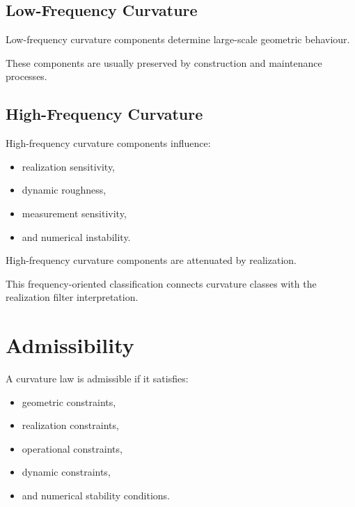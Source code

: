 \subsection{Low-Frequency Curvature}

\begin{definition}
\label{def:low-frequency-curvature}
Low-frequency curvature components determine large-scale geometric
behaviour.
\end{definition}

These components are usually preserved by construction and maintenance
processes.


\subsection{High-Frequency Curvature}

\begin{definition}
\label{def:high-frequency-curvature}
High-frequency curvature components influence:
\begin{itemize}
\item realization sensitivity,
\item dynamic roughness,
\item measurement sensitivity,
\item and numerical instability.
\end{itemize}
\end{definition}

\begin{proposition}
\label{prop:curvature-classes-spectral-realization}
High-frequency curvature components are attenuated by realization.
\end{proposition}

This frequency-oriented classification connects curvature classes with
the realization filter interpretation.

\section{Admissibility}

\begin{definition}
\label{def:admissible-curvature-law}
A curvature law is admissible if it satisfies:
\begin{itemize}
\item geometric constraints,
\item realization constraints,
\item operational constraints,
\item dynamic constraints,
\item and numerical stability conditions.
\end{itemize}
\end{definition}

